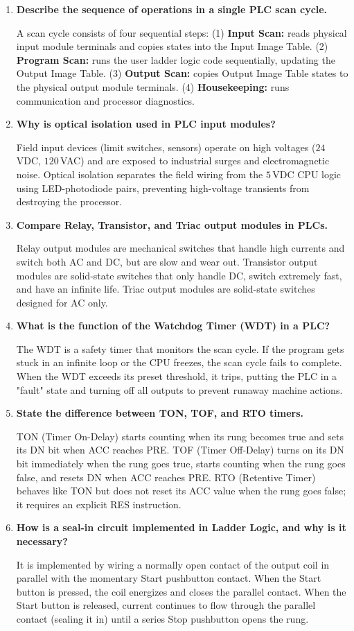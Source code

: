 \documentclass[12pt,a4paper]{article}
\newcommand{\Q}[1]{\textbf{#1}\par\noindent\ignorespaces}
\begin{document}
\begin{tcolorbox}[exambox, title={\textbf{Frequently Asked / Viva Questions}}]
\begin{enumerate}[leftmargin=*, itemsep=4pt]
  \item \Q{Describe the sequence of operations in a single PLC scan cycle.}
    A scan cycle consists of four sequential steps: (1) \textbf{Input Scan:} reads physical input module terminals and copies states into the Input Image Table. (2) \textbf{Program Scan:} runs the user ladder logic code sequentially, updating the Output Image Table. (3) \textbf{Output Scan:} copies Output Image Table states to the physical output module terminals. (4) \textbf{Housekeeping:} runs communication and processor diagnostics.
  \item \Q{Why is optical isolation used in PLC input modules?}
    Field input devices (limit switches, sensors) operate on high voltages ($24\,$VDC, $120\,$VAC) and are exposed to industrial surges and electromagnetic noise. Optical isolation separates the field wiring from the $5\,$VDC CPU logic using LED-photodiode pairs, preventing high-voltage transients from destroying the processor.
  \item \Q{Compare Relay, Transistor, and Triac output modules in PLCs.}
    Relay output modules are mechanical switches that handle high currents and switch both AC and DC, but are slow and wear out. Transistor output modules are solid-state switches that only handle DC, switch extremely fast, and have an infinite life. Triac output modules are solid-state switches designed for AC only.
  \item \Q{What is the function of the Watchdog Timer (WDT) in a PLC?}
    The WDT is a safety timer that monitors the scan cycle. If the program gets stuck in an infinite loop or the CPU freezes, the scan cycle fails to complete. When the WDT exceeds its preset threshold, it trips, putting the PLC in a "fault" state and turning off all outputs to prevent runaway machine actions.
  \item \Q{State the difference between TON, TOF, and RTO timers.}
    TON (Timer On-Delay) starts counting when its rung becomes true and sets its DN bit when ACC reaches PRE. TOF (Timer Off-Delay) turns on its DN bit immediately when the rung goes true, starts counting when the rung goes false, and resets DN when ACC reaches PRE. RTO (Retentive Timer) behaves like TON but does not reset its ACC value when the rung goes false; it requires an explicit RES instruction.
  \item \Q{How is a seal-in circuit implemented in Ladder Logic, and why is it necessary?}
    It is implemented by wiring a normally open contact of the output coil in parallel with the momentary Start pushbutton contact. When the Start button is pressed, the coil energizes and closes the parallel contact. When the Start button is released, current continues to flow through the parallel contact (sealing it in) until a series Stop pushbutton opens the rung.
\end{enumerate}
\end{tcolorbox}
\end{document}

